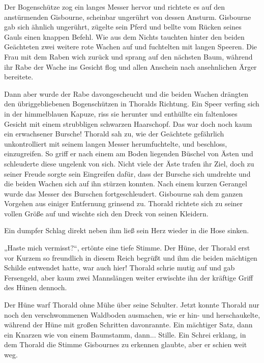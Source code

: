 Der Bogenschütze zog ein langes Messer hervor und richtete es auf den anstürmenden Gisbourne, scheinbar ungerührt von dessen Ansturm. Gisbourne gab sich ähnlich ungerührt, zügelte sein Pferd und bellte vom Rücken seines Gauls einen knappen Befehl. Wie aus dem Nichts tauchten hinter den beiden Geächteten zwei weitere rote Wachen auf und fuchtelten mit langen Speeren. Die Frau mit dem Raben wich zurück und sprang auf den nächsten Baum, während ihr Rabe der Wache ins Gesicht flog und allen Anschein nach ansehnlichen Ärger bereitete.

Dann aber wurde der Rabe davongescheucht und die beiden Wachen drängten den übriggebliebenen Bogenschützen in Thoralds Richtung. Ein Speer verfing sich in der himmelblauen Kapuze, riss sie herunter und enthüllte ein faltenloses Gesicht mit einem strubbligen schwarzen Haarschopf. Das war doch noch kaum ein erwachsener Bursche! Thorald sah zu, wie der Geächtete gefährlich unkontrolliert mit seinem langen Messer herumfuchtelte, und beschloss, einzugreifen. So griff er nach einem am Boden liegenden Büschel von Ästen und schleuderte diese ungelenk von sich. Nicht viele der Äste trafen ihr Ziel, doch zu seiner Freude sorgte sein Eingreifen dafür, dass der Bursche sich umdrehte und die beiden Wachen sich auf ihn stürzen konnten. Nach einem kurzen Gerangel wurde das Messer des Burschen fortgeschleudert. Gisbourne sah dem ganzen Vorgehen aus einiger Entfernung grinsend zu. Thorald richtete sich zu seiner vollen Größe auf und wischte sich den Dreck von seinen Kleidern.

Ein dumpfer Schlag direkt neben ihm ließ sein Herz wieder in die Hose sinken.

„Haste mich vermisst?“, ertönte eine tiefe Stimme. Der Hüne, der Thorald erst vor Kurzem so freundlich in diesem Reich begrüßt und ihm die beiden mächtigen Schilde entwendet hatte, war auch hier! Thorald schrie mutig auf und gab Fersengeld, aber kaum zwei Mannslängen weiter erwischte ihn der kräftige Griff des Hünen dennoch.

Der Hüne warf Thorald ohne Mühe über seine Schulter. Jetzt konnte Thorald nur noch den verschwommenen Waldboden ausmachen, wie er hin- und herschaukelte, während der Hüne mit großen Schritten davonrannte. Ein mächtiger Satz, dann ein Knarzen wie von einem Baumstamm, dann... Stille. Ein Schrei erklang, in dem Thorald die Stimme Gisbournes zu erkennen glaubte, aber er schien weit weg.



\trennzeichen



